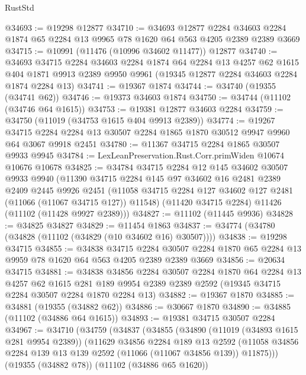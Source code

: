 \begin{lexlean}{RustStd}
\begin{coremodule}
@34693 := @19298 @12877
@34710 := @34693
    @12877
    @2284
    @34603
    @2284
    @1874
    @65
    @2284
    @13
    @9965
    @78
    @1620
    @64
    @563
    @4205
    @2389
    @2389
    @3669
@34715 := @10991 (@11476 (@10996 @34602 @11477)) @12877
@34740 := @34693
    @34715
    @2284
    @34603
    @2284
    @1874
    @64
    @2284
    @13
    @4257
    @62
    @1615
    @404
    @1871
    @9913
    @2389
    @9950
    @9961
    (@19345 @12877 @2284 @34603 @2284 @1874 @2284 @13)
@34741 := @19367 @1874
@34744 := @34740 (@19355 (@34741 @62))
@34746 := @19373 @34603 @1874
@34750 := @34744 (@11102 (@34746 @64 @1615))
@34753 := @19381 @12877 @34603 @2284
@34759 := @34750 (@11019 (@34753 @1615 @404 @9913 @2389))
@34774 := @19267
    @34715
    @2284
    @2284
    @13
    @30507
    @2284
    @1865
    @1870
    @30512
    @9947
    @9960
    @64
    @3067
    @9918
    @2451
@34780 := @11367 @34715 @2284 @1865 @30507 @9933 @9945
@34784 := LexLeanPreservation.Rust.Corr.primWiden @10674 @10676 @10678
@34825 := @34784
    @34715
    @2284
    @12
    @145
    @34602
    @30507
    @9933
    @9940
    (@11390
      @34715
      @2284
      @145
      @97
      @34602
      @16
      @2481
      @2389
      @2409
      @2445
      @9926
      @2451
      (@11058 @34715 @2284 @127 @34602 @127 @2481 (@11066 (@11067 @34715 @127)) @11548)
      (@11420 @34715 @2284)
      @11426
      (@11102 (@11428 @9927 @2389)))
@34827 := @11102 (@11445 @9936)
@34828 := @34825 @34827
@34829 := @11454 @1863
@34837 := @34774 (@34780 (@34828 (@11102 (@34829 (@10 @34602 @16) @30507))))
@34838 := @19298 @34715
@34855 := @34838
    @34715
    @2284
    @30507
    @2284
    @1870
    @65
    @2284
    @13
    @9959
    @78
    @1620
    @64
    @563
    @4205
    @2389
    @2389
    @3669
@34856 := @20634 @34715
@34881 := @34838
    @34856
    @2284
    @30507
    @2284
    @1870
    @64
    @2284
    @13
    @4257
    @62
    @1615
    @281
    @189
    @9954
    @2389
    @2389
    @2592
    (@19345 @34715 @2284 @30507 @2284 @1870 @2284 @13)
@34882 := @19367 @1870
@34885 := @34881 (@19355 (@34882 @62))
@34886 := @30667 @1870
@34890 := @34885 (@11102 (@34886 @64 @1615))
@34893 := @19381 @34715 @30507 @2284
@34967 := @34710
    (@34759
      (@34837
        (@34855
          (@34890
            (@11019 (@34893 @1615 @281 @9954 @2389))
            (@11629
              @34856
              @2284
              @189
              @13
              @2592
              (@11058 @34856 @2284 @139 @13 @139 @2592 (@11066 (@11067 @34856 @139)) @11875)))
          (@19355 (@34882 @78))
          (@11102 (@34886 @65 @1620))

\end{coremodule}
\end{lexlean}
